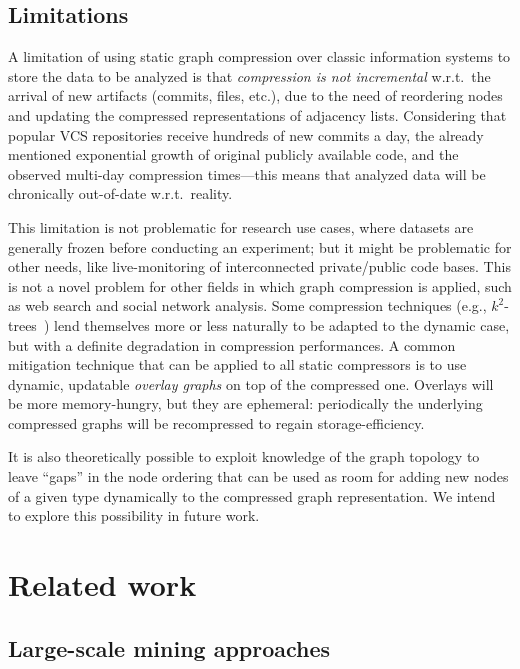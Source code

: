 \subsection{Limitations}

A limitation of using static graph compression over classic information systems
to store the data to be analyzed is that \emph{compression is not incremental}
w.r.t.~the arrival of new artifacts (commits, files, etc.), due to the need of
reordering nodes and updating the compressed representations of adjacency
lists. Considering that popular VCS repositories receive hundreds of new
commits a day, the already mentioned exponential growth of original publicly
available code, and the observed multi-day compression times---this means that
analyzed data will be chronically out-of-date w.r.t.~reality.

This limitation is not problematic for research use cases, where datasets are
generally frozen before conducting an experiment; but it might be problematic
for other needs, like live-monitoring of interconnected private/public code
bases. This is not a novel problem for other fields in which graph compression
is applied, such as web search and social network analysis. Some compression
techniques (e.g., $k^2$-trees~\cite{brisaboa2017compressed}) lend themselves
more or less naturally to be adapted to the dynamic case, but with a definite
degradation in compression performances. A common mitigation technique that can
be applied to all static compressors is to use dynamic, updatable \emph{overlay
  graphs} on top of the compressed one. Overlays will be more memory-hungry,
but they are ephemeral: periodically the underlying compressed graphs will be
recompressed to regain storage-efficiency.

It is also theoretically possible to exploit knowledge of the graph topology to
leave ``gaps'' in the node ordering that can be used as room for adding new
nodes of a given type dynamically to the compressed graph representation. We
intend to explore this possibility in future work.

\section{Related work}%
\label{sec:compression-related}

\subsection{Large-scale mining approaches}

